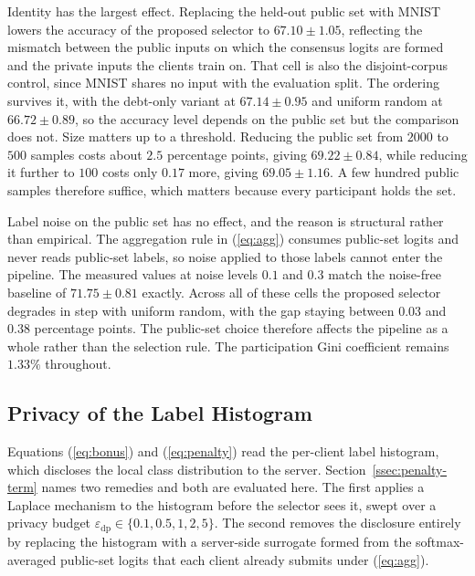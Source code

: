 \documentclass[journal]{IEEEtran}
\newcommand{\rev}[1]{{\color{blue}#1}}
\begin{document}
\rev{Identity has the largest effect. Replacing the held-out public set with MNIST lowers the accuracy of the proposed selector to $67.10 \pm 1.05$, reflecting the mismatch between the public inputs on which the consensus logits are formed and the private inputs the clients train on. That cell is also the disjoint-corpus control, since MNIST shares no input with the evaluation split. The ordering survives it, with the debt-only variant at $67.14 \pm 0.95$ and uniform random at $66.72 \pm 0.89$, so the accuracy level depends on the public set but the comparison does not. Size matters up to a threshold. Reducing the public set from $2000$ to $500$ samples costs about $2.5$ percentage points, giving $69.22 \pm 0.84$, while reducing it further to $100$ costs only $0.17$ more, giving $69.05 \pm 1.16$. A few hundred public samples therefore suffice, which matters because every participant holds the set.}

\rev{Label noise on the public set has no effect, and the reason is structural rather than empirical. The aggregation rule in (\ref{eq:agg}) consumes public-set logits and never reads public-set labels, so noise applied to those labels cannot enter the pipeline. The measured values at noise levels $0.1$ and $0.3$ match the noise-free baseline of $71.75 \pm 0.81$ exactly. Across all of these cells the proposed selector degrades in step with uniform random, with the gap staying between $0.03$ and $0.38$ percentage points. The public-set choice therefore affects the pipeline as a whole rather than the selection rule. The participation Gini coefficient remains $1.33\%$ throughout.}

\subsection{Privacy of the Label Histogram}
\label{ssec:exp-privacy}

\rev{Equations (\ref{eq:bonus}) and (\ref{eq:penalty}) read the per-client label histogram, which discloses the local class distribution to the server. Section~\ref{ssec:penalty-term} names two remedies and both are evaluated here. The first applies a Laplace mechanism to the histogram before the selector sees it, swept over a privacy budget $\varepsilon_{\mathrm{dp}} \in \{0.1, 0.5, 1, 2, 5\}$. The second removes the disclosure entirely by replacing the histogram with a server-side surrogate formed from the softmax-averaged public-set logits that each client already submits under (\ref{eq:agg}).}
\end{document}
